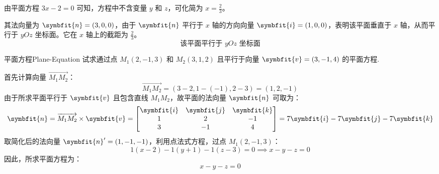 \begin{solution}

    由平面方程 $3x - 2 = 0$ 可知，方程中不含变量 $y$ 和 $z$，可化简为 $x = \frac{2}{3}$。

    其法向量为 $\symbfit{n} = (3, 0, 0)$，由于 $\symbfit{n}$ 平行于 $x$ 轴的方向向量 $\symbfit{i} = (1, 0, 0)$，表明该平面垂直于 $x$ 轴，从而平行于 $yOz$ 坐标面。它在 $x$ 轴上的截距为 $\frac{2}{3}$。
    \begin{equation*}
        \boxed{\text{该平面平行于 } yOz \text{ 坐标面}}
    \end{equation*}

    \begin{center}
    \end{center}

\end{solution}


\begin{problem}{平面方程}{Plane-Equation}
    试求通过点 $M_1(2, -1, 3)$ 和 $M_2(3, 1, 2)$ 且平行于向量 $\symbfit{v} = (3, -1, 4)$ 的平面方程.
\end{problem}

\begin{solution}
    首先计算向量 $\overrightarrow{M_1 M_2}$：
    \begin{equation*}
        \overrightarrow{M_1 M_2} = (3-2, 1-(-1), 2-3) = (1, 2, -1)
    \end{equation*}
    由于所求平面平行于 $\symbfit{v}$ 且包含直线 $M_1 M_2$，故平面的法向量 $\symbfit{n}$ 可取为：
    \begin{equation*}
        \symbfit{n} = \overrightarrow{M_1 M_2} \times \symbfit{v} = \begin{bmatrix} \symbfit{i} & \symbfit{j} & \symbfit{k} \\ 1 & 2 & -1 \\ 3 & -1 & 4 \end{bmatrix} = 7\symbfit{i} - 7\symbfit{j} - 7\symbfit{k}
    \end{equation*}
    取简化后的法向量 $\symbfit{n}' = (1, -1, -1)$，利用点法式方程，过点 $M_1(2, -1, 3)$：
    \begin{equation*}
        1(x - 2) - 1(y + 1) - 1(z - 3) = 0 \implies x - y - z = 0
    \end{equation*}
    因此，所求平面方程为：
    \begin{equation*}
        \boxed{x - y - z = 0}
    \end{equation*}
\end{solution}

